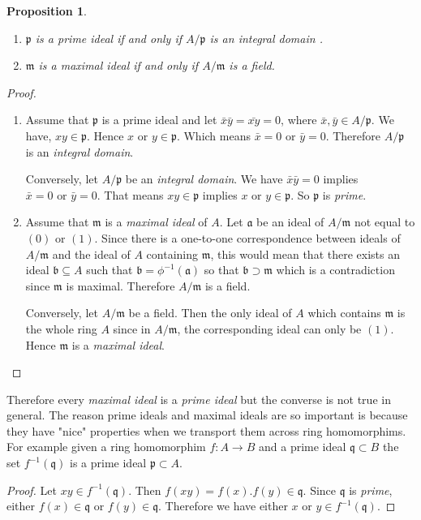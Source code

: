 \documentclass[]{report}
\newtheorem{prop}[theorem]{Proposition}
\newcommand\mfk[1]{\mathfrak{#1}}
\begin{document}
\begin{prop}
    \begin{enumerate}
        \item $\mathfrak{p}$ is a \textit{prime ideal} if and only if $A/\mathfrak{p}$ is an \textit{integral domain }. 
        \item $\mathfrak{m}$ is a \textit{maximal ideal} if and only if $A/\mathfrak{m}$ is a field.
    \end{enumerate}
\end{prop}
\begin{proof}
    \begin{enumerate}
        \item Assume that $\mfk{p}$ is a prime ideal and let $\bar{x} \bar{y} = \bar{xy} = 0$, where $\bar{x}, \bar{y} \in A/\mfk{p}$. We have, $xy \in \mfk{p}$. Hence $x \text{ or } y \in \mfk{p}$. Which means $\bar{x} = 0 \text{ or } \bar{y} = 0$. Therefore $A/\mfk{p}$ is an \textit{integral domain}.

            Conversely, let $A/\mfk{p}$ be an \textit{integral domain}. We have $\bar{x}\bar{y} = 0$ implies $\bar{x} = 0 \text{ or } \bar{y} = 0$. That means $xy \in \mfk{p}$ implies $x \text{ or } y \in \mfk{p}$. So $\mfk{p}$ is \textit{prime}.

        \item Assume that $\mfk{m}$ is a \textit{maximal ideal} of $A$. Let $\mfk{a}$ be an ideal of $A/\mfk{m}$ not equal to $(0) \text{ or } (1)$. Since there is a one-to-one correspondence between ideals of $A/\mfk{m}$ and the ideal of $A$ containing $\mfk{m}$, this would mean that there exists an ideal $\mfk{b} \subseteq A$ such that $\mfk{b} = \phi^{-1}(\mfk{a})$ so that $\mfk{b} \supset \mfk{m}$ which is a contradiction since $\mfk{m}$ is maximal. Therefore $A/\mfk{m}$ is a field.

            Conversely, let $A/\mfk{m}$ be a field. Then the only ideal of $A$ which contains $\mfk{m}$ is the whole ring $A$ since in $A/\mfk{m}$, the corresponding ideal can only be $(1)$. Hence $\mfk{m}$ is a \textit{maximal ideal}.
    \end{enumerate}
\end{proof}

Therefore every \textit{maximal ideal} is a \textit{prime ideal} but the converse is not true in general. The reason prime ideals and maximal ideals are so important is because they have "nice" properties when we transport them across ring homomorphims. For example given a ring homomorphim $f:A\rightarrow B$ and a prime ideal $\mathfrak{q}\subset B$ the set $f^{-1}(\mathfrak{q})$ is a prime ideal  $\mathfrak{p}\subset A$. 
\begin{proof}
    Let $xy \in f^{-1}(\mathfrak{q})$. Then $f(xy) = f(x).f(y) \in \mathfrak{q}$. Since $\mathfrak{q}$ is \textit{prime}, either $f(x) \in \mathfrak{q} \text{ or } f(y) \in \mathfrak{q}$. Therefore we have either $x \text{ or } y \in f^{-1}(\mathfrak{q})$.
\end{proof}
\end{document}
